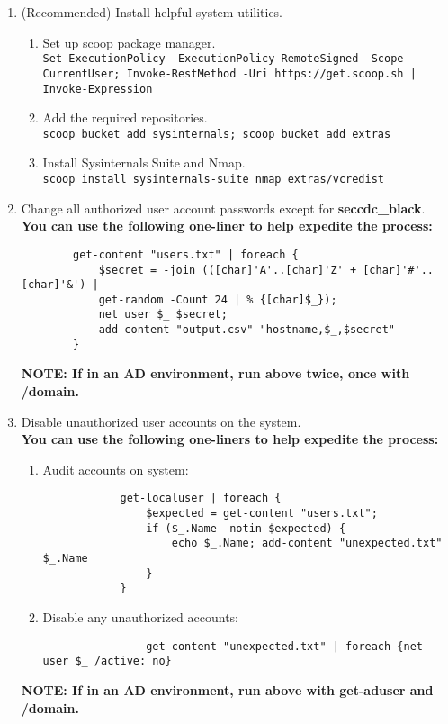 \documentclass[12pt,letterpaper]{article}
\def\code#1{\textcolor{c2}{\texttt{#1}}}
\def\bf#1{\textbf{#1}}
\begin{document}
\begin{enumerate}
	\item (Recommended) Install helpful system utilities.
		\begin{enumerate}
			\item Set up scoop package manager. \\
				\code{Set-ExecutionPolicy -ExecutionPolicy RemoteSigned -Scope CurrentUser; Invoke-RestMethod -Uri https://get.scoop.sh | Invoke-Expression}
			\item Add the required repositories. \\
				\code{scoop bucket add sysinternals; scoop bucket add extras}
			\item Install Sysinternals Suite and Nmap. \\
				\code{scoop install sysinternals-suite nmap extras/vcredist}
		\end{enumerate}
	\item Change all authorized user account passwords except for \bf{seccdc\_black}. \\
		\bf{You can use the following one-liner to help expedite the process:}
		\begin{verbatim}
		get-content "users.txt" | foreach {
			$secret = -join (([char]'A'..[char]'Z' + [char]'#'..[char]'&') |
			get-random -Count 24 | % {[char]$_});
			net user $_ $secret;
			add-content "output.csv" "hostname,$_,$secret"
		}
		\end{verbatim}
	\bf{NOTE: If in an AD environment, run above twice, once with /domain.}
	\item Disable unauthorized user accounts on the system. \\
		\bf{You can use the following one-liners to help expedite the process:}
		\begin{enumerate}
			\item Audit accounts on system: \\
			\begin{verbatim}
			get-localuser | foreach {
				$expected = get-content "users.txt";
				if ($_.Name -notin $expected) {
					echo $_.Name; add-content "unexpected.txt" $_.Name
				}
			}
			\end{verbatim}
			\item Disable any unauthorized accounts:
				\begin{verbatim}
				get-content "unexpected.txt" | foreach {net user $_ /active: no}
				\end{verbatim}
		\end{enumerate}
		\bf{NOTE: If in an AD environment, run above with get-aduser and /domain.}

\end{enumerate}
\end{document}
